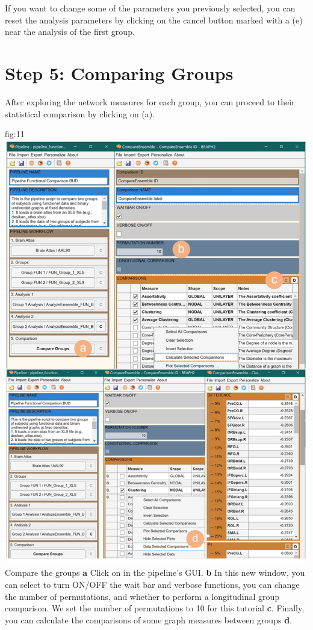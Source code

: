 \documentclass[justified]{tufte-handout}
\begin{document}
	
If you want to change some of the parameters you previously selected, you can reset the analysis parameters by clicking on the cancel button marked with a  (e) near the analysis of the first group.
 
\clearpage
\section{Step 5: Comparing Groups}

After exploring the network measures for each group, you can proceed to their statistical comparison by clicking on  (a).

	{fig:11}
	{
	\includegraphics{fig11.png}
	}
	{Compare the groups}
	{
	{\bf a} Click on  in the pipeline's GUI.
	{\bf b} In this new window, you can select to turn ON/OFF the wait bar and verbose functions, you can change the number of permutations, and whether to perform a longitudinal group comparison. We set the number of permutations to 10 for this tutorial {\bf c}. Finally, you can calculate the comparisons of some graph measures between groups {\bf d}.
	}
\end{document}
